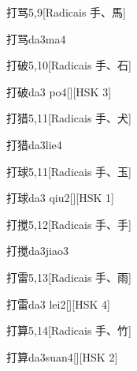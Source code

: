 \begin{entry}{打骂}{5,9}[Radicais ⼿、⾺]
  \begin{phonetics}{打骂}{da3ma4}
  \end{phonetics}
\end{entry}

\begin{entry}{打破}{5,10}[Radicais ⼿、⽯]
  \begin{phonetics}{打破}{da3 po4}[][HSK 3]
  \end{phonetics}
\end{entry}

\begin{entry}{打猎}{5,11}[Radicais ⼿、⽝]
  \begin{phonetics}{打猎}{da3lie4}
  \end{phonetics}
\end{entry}

\begin{entry}{打球}{5,11}[Radicais ⼿、⽟]
  \begin{phonetics}{打球}{da3 qiu2}[][HSK 1]
  \end{phonetics}
\end{entry}

\begin{entry}{打搅}{5,12}[Radicais ⼿、⼿]
  \begin{phonetics}{打搅}{da3jiao3}
  \end{phonetics}
\end{entry}

\begin{entry}{打雷}{5,13}[Radicais ⼿、⾬]
  \begin{phonetics}{打雷}{da3 lei2}[][HSK 4]
  \end{phonetics}
\end{entry}

\begin{entry}{打算}{5,14}[Radicais ⼿、⽵]
  \begin{phonetics}{打算}{da3suan4}[][HSK 2]
  \end{phonetics}
\end{entry}

